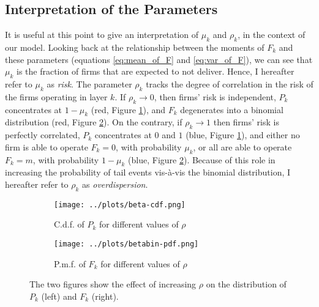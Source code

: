 \documentclass[../../main.tex]{subfiles}
\begin{document}
\subsection{Interpretation of the Parameters}

It is useful at this point to give an interpretation of $\mu_k$ and $\rho_k$, in the context of our model. Looking back at the relationship between the moments of $F_k$ and these parameters (equations \ref{eq:mean_of_F} and \ref{eq:var_of_F}), we can see that $\mu_k$ is the fraction of firms that are expected to not deliver. Hence, I hereafter refer to $\mu_k$ as \textit{risk}. The parameter $\rho_k$ tracks the degree of correlation in the risk of the firms operating in layer $k$. If $\rho_k \to 0$, then firms' risk is independent, $P_k$ concentrates at $1 - \mu_k$ (red, Figure \ref{fig:distribution-illustration:beta}), and $F_k$ degenerates into a binomial distribution (red, Figure \ref{fig:distribution-illustration:beta-binomial}). On the contrary, if $\rho_k \rightarrow 1$ then firms' risk is perfectly correlated, $P_k$ concentrates at $0$ and $1$ (blue, Figure \ref{fig:distribution-illustration:beta}), and either no firm is able to operate $F_{k} = 0$, with probability $\mu_k$, or all are able to operate $F_{k} = m$, with probability $1 - \mu_k$ (blue, Figure \ref{fig:distribution-illustration:beta-binomial}). Because of this role in increasing the probability of tail events vis-à-vis the binomial distribution, I hereafter refer to $\rho_k$ as \textit{overdispersion}.



\begin{figure}[H]
  \centering
  \begin{subfigure}{.5\textwidth}
    \centering
    \texttt{[image: ../plots/beta-cdf.png]}
    \caption{C.d.f. of $P_k$ for different values of $\rho$}
    \label{fig:distribution-illustration:beta}
  \end{subfigure}%
  \begin{subfigure}{.5\textwidth}
    \centering
    \texttt{[image: ../plots/betabin-pdf.png]} 
    \caption{P.m.f. of $F_k$ for different values of $\rho$}
    \label{fig:distribution-illustration:beta-binomial}
  \end{subfigure}%
  \caption{The two figures show the effect of increasing $\rho$ on the distribution of $P_k$ (left) and $F_k$ (right).}
  \label{fig:distribution-illustration}
\end{figure}
\end{document}
